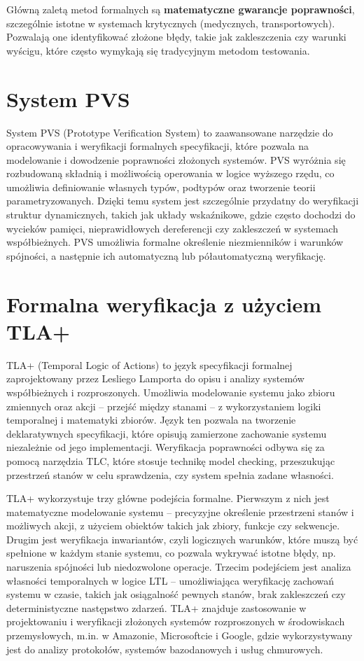 \documentclass[conference]{IEEEtran}
\begin{document}
        Główną zaletą metod formalnych są \textbf{matematyczne gwarancje poprawności}, szczególnie istotne w systemach krytycznych (medycznych, transportowych).
        Pozwalają one identyfikować złożone błędy, takie jak zakleszczenia czy warunki wyścigu, które często wymykają się tradycyjnym metodom testowania.
    
    \section{System PVS}
    System PVS (Prototype Verification System) to zaawansowane narzędzie do opracowywania i weryfikacji formalnych specyfikacji, które pozwala na modelowanie i dowodzenie poprawności złożonych systemów. 
    PVS wyróżnia się rozbudowaną składnią i możliwością operowania w logice wyższego rzędu, co umożliwia definiowanie własnych typów, podtypów oraz tworzenie teorii parametryzowanych. 
    Dzięki temu system jest szczególnie przydatny do weryfikacji struktur dynamicznych, takich jak układy wskaźnikowe, gdzie często dochodzi do wycieków pamięci, nieprawidłowych dereferencji czy zakleszczeń w systemach współbieżnych. 
    PVS umożliwia formalne określenie niezmienników i warunków spójności, a następnie ich automatyczną lub półautomatyczną weryfikację.
        
    \section{Formalna weryfikacja z użyciem TLA+}
    TLA+ (Temporal Logic of Actions) to język specyfikacji formalnej zaprojektowany przez Lesliego Lamporta do opisu i analizy systemów współbieżnych i rozproszonych. Umożliwia modelowanie systemu jako zbioru zmiennych oraz akcji – przejść między stanami – z wykorzystaniem logiki temporalnej i matematyki zbiorów. Język ten pozwala na tworzenie deklaratywnych specyfikacji, które opisują zamierzone zachowanie systemu niezależnie od jego implementacji. Weryfikacja poprawności odbywa się za pomocą narzędzia TLC, które stosuje technikę model checking, przeszukując przestrzeń stanów w celu sprawdzenia, czy system spełnia zadane własności.

    TLA+ wykorzystuje trzy główne podejścia formalne. Pierwszym z nich jest matematyczne modelowanie systemu – precyzyjne określenie przestrzeni stanów i możliwych akcji, z użyciem obiektów takich jak zbiory, funkcje czy sekwencje. Drugim jest weryfikacja inwariantów, czyli logicznych warunków, które muszą być spełnione w każdym stanie systemu, co pozwala wykrywać istotne błędy, np. naruszenia spójności lub niedozwolone operacje. Trzecim podejściem jest analiza własności temporalnych w logice LTL – umożliwiająca weryfikację zachowań systemu w czasie, takich jak osiągalność pewnych stanów, brak zakleszczeń czy deterministyczne następstwo zdarzeń. TLA+ znajduje zastosowanie w projektowaniu i weryfikacji złożonych systemów rozproszonych w środowiskach przemysłowych, m.in. w Amazonie, Microsoftcie i Google, gdzie wykorzystywany jest do analizy protokołów, systemów bazodanowych i usług chmurowych.
    
\end{document}
